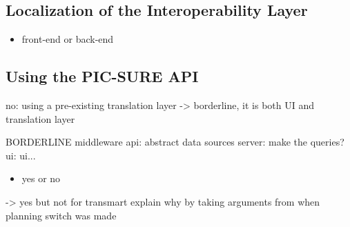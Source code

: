

\subsection{Localization of the Interoperability Layer}



\begin{itemize}
    \item front-end or back-end
\end{itemize}


\subsection{Using the PIC-SURE API} no: using a pre-existing translation layer -> borderline, it is both UI and translation layer

BORDERLINE
middleware api: abstract data sources
server: make the queries?
ui: ui...


\begin{itemize}
    \item yes or no
\end{itemize}
-> yes but not for transmart
explain why by taking arguments from when planning switch was made


